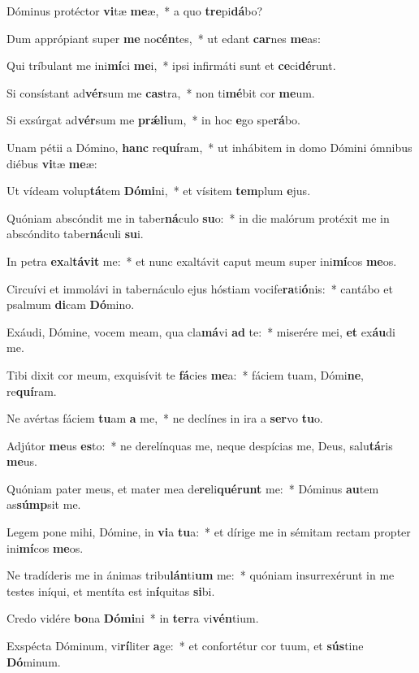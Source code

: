 \item Dóminus protéctor \textbf{vi}tæ \textbf{me}æ,~* a quo \textbf{tre}pi\textbf{dá}bo?
\item Dum apprópiant super \textbf{me} no\textbf{cén}tes,~* ut edant \textbf{car}nes \textbf{me}as:
\item Qui tríbulant me ini\textbf{mí}ci \textbf{me}i,~* ipsi infirmáti sunt et \textbf{ce}ci\textbf{dé}runt.
\item Si consístant ad\textbf{vér}sum me \textbf{cas}tra,~* non ti\textbf{mé}bit cor \textbf{me}um.
\item Si exsúrgat ad\textbf{vér}sum me \textbf{prǽ}\textbf{li}um,~* in hoc \textbf{e}go spe\textbf{rá}bo.
\item Unam pétii a Dómino, \textbf{hanc} re\textbf{quí}ram,~* ut inhábitem in domo Dómini ómnibus diébus \textbf{vi}tæ \textbf{me}æ:
\item Ut vídeam volup\textbf{tá}tem \textbf{Dó}\textbf{mi}ni,~* et vísitem \textbf{tem}plum \textbf{e}jus.
\item Quóniam abscóndit me in taber\textbf{ná}culo \textbf{su}o:~* in die malórum protéxit me in abscóndito taber\textbf{ná}culi \textbf{su}i.
\item In petra \textbf{ex}al\textbf{tá}\textbf{vit} me:~* et nunc exaltávit caput meum super ini\textbf{mí}cos \textbf{me}os.
\item Circuívi et immolávi in tabernáculo ejus hóstiam vocife\textbf{ra}ti\textbf{ó}nis:~* cantábo et psalmum \textbf{di}cam \textbf{Dó}mino.
\item Exáudi, Dómine, vocem meam, qua cla\textbf{má}vi \textbf{ad} te:~* miserére mei, \textbf{et} ex\textbf{áu}di me.
\item Tibi dixit cor meum, exquisívit te \textbf{fá}cies \textbf{me}a:~* fáciem tuam, Dómi\textbf{ne}, re\textbf{quí}ram.
\item Ne avértas fáciem \textbf{tu}am \textbf{a} me,~* ne declínes in ira a \textbf{ser}vo \textbf{tu}o.
\item Adjútor \textbf{me}us \textbf{es}to:~* ne derelínquas me, neque despícias me, Deus, salu\textbf{tá}ris \textbf{me}us.
\item Quóniam pater meus, et mater mea de\textbf{re}li\textbf{qué}\textbf{runt} me:~* Dóminus \textbf{au}tem as\textbf{súmp}sit me.
\item Legem pone mihi, Dómine, in \textbf{vi}a \textbf{tu}a:~* et dírige me in sémitam rectam propter ini\textbf{mí}cos \textbf{me}os.
\item Ne tradíderis me in ánimas tribu\textbf{lán}ti\textbf{um} me:~* quóniam insurrexérunt in me testes iníqui, et mentíta est in\textbf{í}quitas \textbf{si}bi.
\item Credo vidére \textbf{bo}na \textbf{Dó}\textbf{mi}ni~* in \textbf{ter}ra vi\textbf{vén}tium.
\item Exspécta Dóminum, vi\textbf{rí}liter \textbf{a}ge:~* et confortétur cor tuum, et \textbf{sús}tine \textbf{Dó}minum.
